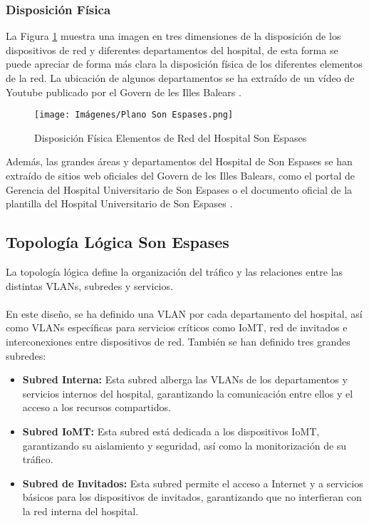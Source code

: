 \subsubsection{Disposición Física}
\label{subsubsec:disposicion}
La Figura \ref{fig:disposicion} muestra una imagen en tres dimensiones de la disposición de los dispositivos de red y diferentes departamentos del hospital, de esta forma se puede apreciar 
de forma más clara la disposición física de los diferentes elementos de la red. La ubicación de algunos departamentos se ha extraído de un vídeo de Youtube publicado por el Govern de les Illes Balears \cite{SonEspases}.
\begin{figure}[H]
    \centering
    \texttt{[image: Imágenes/Plano Son Espases.png]}
    \caption{Disposición Física Elementos de Red del Hospital Son Espases}
    \label{fig:disposicion}
\end{figure}
Además, las grandes áreas y departamentos del Hospital de Son Espases se han extraído de sitios web oficiales del Govern de les Illes Balears, como el portal de Gerencia del Hospital Universitario de Son Espases 
\cite{GerenciaSonEspases} o el documento oficial de la plantilla del Hospital Universitario de Son Espases \cite{PlantillaSonEspases}.

\subsection{Topología Lógica Son Espases}

La topología lógica define la organización del tráfico y las relaciones entre las distintas VLANs, subredes y servicios.
\\ \\
En este diseño, se ha definido una VLAN por cada departamento del hospital, así como VLANs específicas para servicios críticos como IoMT, red de invitados e interconexiones entre dispositivos de red. También se han definido tres grandes subredes:
\begin{itemize}
    \item \textbf{Subred Interna:} Esta subred alberga las VLANs de los departamentos y servicios internos del hospital, garantizando la comunicación entre ellos y el acceso a los recursos compartidos.
    \item \textbf{Subred IoMT:} Esta subred está dedicada a los dispositivos IoMT, garantizando su aislamiento y seguridad, así como la monitorización de su tráfico.
    \item \textbf{Subred de Invitados:} Esta subred permite el acceso a Internet y a servicios básicos para los dispositivos de invitados, garantizando que no interfieran con la red interna del hospital.
\end{itemize}

